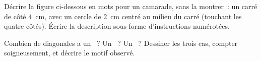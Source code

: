 \begin{exercise}[$\star\star$]\label{exo:g4:geometry:10}
Décrire la figure ci-dessous en mots pour un camarade, sans la
montrer~: un carré de côté $4$~cm, avec un cercle de  $2$~cm
centré au milieu du carré (touchant les quatre côtés). Écrire la
description sous forme d'instructions numérotées.
\end{exercise}

\begin{exercise}[$\star\star$]\label{exo:g4:geometry:11}
Combien de diagonales a un ~? Un ~? Un
~? Dessiner les trois cas, compter soigneusement, et
décrire le motif observé.
\end{exercise}
